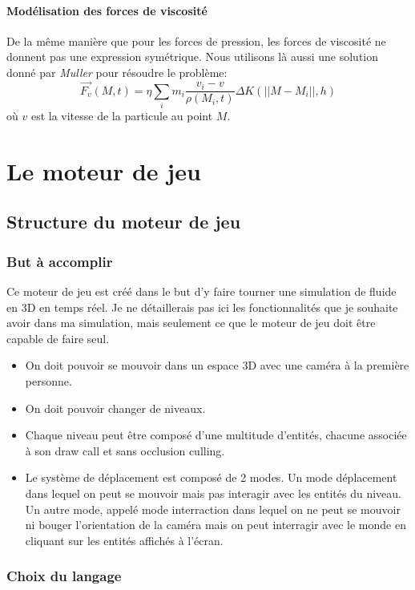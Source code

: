 \documentclass[a4paper,10pt]{report}
\begin{document}
\subsubsection{Modélisation des forces de viscosité}
De la même manière que pour les forces de pression, les forces de viscosité ne donnent pas une expression symétrique. Nous utilisons là aussi une solution donné par {\it Muller} pour résoudre le problème:
$$\vec{F_{v}}(M,t) = \eta \sum_i m_i \frac{v_i - v}{\rho(M_i,t)} \Delta K(||M - M_i||, h)$$
où $v$ est la vitesse de la particule au point $M$.

\chapter{Le moteur de jeu}
\section{Structure du moteur de jeu}

\subsection{But à accomplir}
Ce moteur de jeu est créé dans le but d'y faire tourner une simulation de fluide en 3D en temps réel.
Je ne détaillerais pas ici les fonctionnalités que je souhaite avoir dans ma simulation, mais seulement ce que le moteur de jeu doit être capable de faire seul.
\begin{itemize}
 \item On doit pouvoir se mouvoir dans un espace 3D avec une caméra à la première personne.
 \item On doit pouvoir changer de niveaux.
 \item Chaque niveau peut être composé d'une multitude d'entités, chacune associée à son draw call et sans occlusion culling.
 \item Le système de déplacement est composé de 2 modes. Un mode déplacement dans lequel on peut se mouvoir mais pas interagir avec les entités du niveau. Un autre mode, appelé mode interraction dans lequel on ne peut se mouvoir ni bouger l'orientation de la caméra mais on peut interragir avec le monde en cliquant sur les entités affichés à l'écran.
\end{itemize}


\subsection{Choix du langage}
\end{document}
